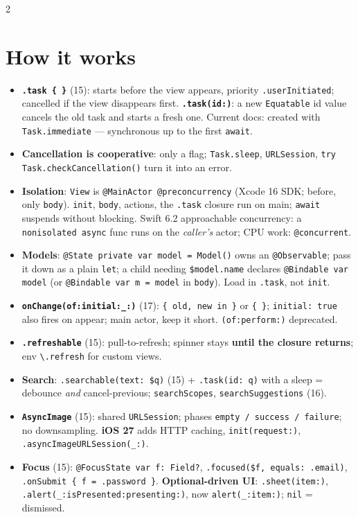 \documentclass[8pt]{extarticle}
\begin{document}
\begin{multicols}{2}
\raggedright

\section{How it works}
\begin{itemize}
  \item \textbf{\texttt{.task \{ \}}} (15): starts before the view appears, priority \texttt{.userInitiated};
        cancelled if the view disappears first. \textbf{\texttt{.task(id:)}}: a new \texttt{Equatable} id value
        cancels the old task and starts a fresh one. Current docs: created with \texttt{Task.immediate} —
        synchronous up to the first \texttt{await}.
  \item \textbf{Cancellation is cooperative}: only a flag; \texttt{Task.sleep}, \texttt{URLSession},
        \texttt{try Task.checkCancellation()} turn it into an error.
  \item \textbf{Isolation}: \texttt{View} is \texttt{@MainActor @preconcurrency} (Xcode 16 SDK; before, only
        \texttt{body}). \texttt{init}, \texttt{body}, actions, the \texttt{.task} closure run on main;
        \texttt{await} suspends without blocking. Swift 6.2 approachable concurrency: a \texttt{nonisolated
        async} func runs on the \emph{caller's} actor; CPU work: \texttt{@concurrent}.
  \item \textbf{Models}: \texttt{@State private var model = Model()} owns an \texttt{@Observable}; pass it
        down as a plain \texttt{let}; a child needing \texttt{\$model.name} declares \texttt{@Bindable var model}
        (or \texttt{@Bindable var m = model} in \texttt{body}). Load in \texttt{.task}, not \texttt{init}.
  \item \textbf{\texttt{onChange(of:initial:\_:)}} (17): \texttt{\{ old, new in \}} or \texttt{\{ \}};
        \texttt{initial: true} also fires on appear; main actor, keep it short. \texttt{(of:perform:)} deprecated.
  \item \textbf{\texttt{.refreshable}} (15): pull-to-refresh; spinner stays \textbf{until the closure
        returns}; env \texttt{\textbackslash.refresh} for custom views.
  \item \textbf{Search}: \texttt{.searchable(text: \$q)} (15) + \texttt{.task(id: q)} with a sleep =
        debounce \emph{and} cancel-previous; \texttt{searchScopes}, \texttt{searchSuggestions} (16).
  \item \textbf{\texttt{AsyncImage}} (15): shared \texttt{URLSession}; phases \texttt{empty / success /
        failure}; no downsampling. \textbf{iOS 27} adds HTTP caching, \texttt{init(request:)},
        \texttt{.asyncImageURLSession(\_:)}.
  \item \textbf{Focus} (15): \texttt{@FocusState var f: Field?}, \texttt{.focused(\$f, equals: .email)},
        \texttt{.onSubmit \{ f = .password \}}. \textbf{Optional-driven UI}: \texttt{.sheet(item:)},
        \texttt{.alert(\_:isPresented:presenting:)}, now \texttt{alert(\_:item:)}; \texttt{nil} = dismissed.
\end{itemize}


\end{multicols}
\end{document}
